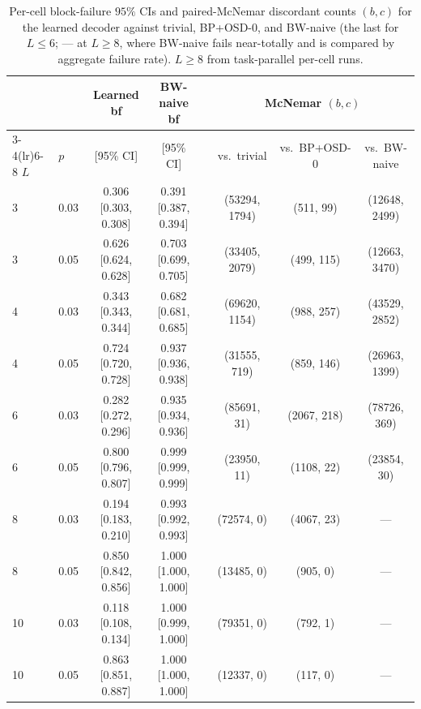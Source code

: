 \documentclass[11pt,a4paper]{article}
\begin{document}
\begin{table}[h]
\centering
\footnotesize
\caption{Per-cell block-failure $95\%$ CIs and paired-McNemar discordant counts
$(b,c)$ for the learned decoder against trivial, BP+OSD-0, and BW-naive (the last
for $L\le 6$; --- at $L\ge 8$, where BW-naive fails near-totally and is compared
by aggregate failure rate). $L\ge 8$ from task-parallel per-cell runs.}
\label{tab:stats}
\begin{tabular}{ll cc c ccc}
\toprule
 & & Learned bf & BW-naive bf & & \multicolumn{3}{c}{McNemar $(b,c)$} \\
\cmidrule(lr){3-4}\cmidrule(lr){6-8}
$L$ & $p$ & [95\% CI] & [95\% CI] & & vs.\ trivial & vs.\ BP+OSD-0 & vs.\ BW-naive \\
\midrule
3 & 0.03 & 0.306 [0.303, 0.308] & 0.391 [0.387, 0.394] & & (53294, 1794) & (511, 99) & (12648, 2499) \\
3 & 0.05 & 0.626 [0.624, 0.628] & 0.703 [0.699, 0.705] & & (33405, 2079) & (499, 115) & (12663, 3470) \\
4 & 0.03 & 0.343 [0.343, 0.344] & 0.682 [0.681, 0.685] & & (69620, 1154) & (988, 257) & (43529, 2852) \\
4 & 0.05 & 0.724 [0.720, 0.728] & 0.937 [0.936, 0.938] & & (31555, 719) & (859, 146) & (26963, 1399) \\
6 & 0.03 & 0.282 [0.272, 0.296] & 0.935 [0.934, 0.936] & & (85691, 31) & (2067, 218) & (78726, 369) \\
6 & 0.05 & 0.800 [0.796, 0.807] & 0.999 [0.999, 0.999] & & (23950, 11) & (1108, 22) & (23854, 30) \\
8 & 0.03 & 0.194 [0.183, 0.210] & 0.993 [0.992, 0.993] & & (72574, 0) & (4067, 23) & --- \\
8 & 0.05 & 0.850 [0.842, 0.856] & 1.000 [1.000, 1.000] & & (13485, 0) & (905, 0) & --- \\
10 & 0.03 & 0.118 [0.108, 0.134] & 1.000 [0.999, 1.000] & & (79351, 0) & (792, 1) & --- \\
10 & 0.05 & 0.863 [0.851, 0.887] & 1.000 [1.000, 1.000] & & (12337, 0) & (117, 0) & --- \\
\bottomrule
\end{tabular}
\end{table}
\end{document}
